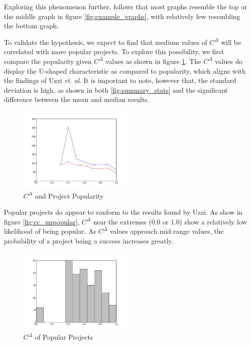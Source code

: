 \documentclass{proc}
\begin{document}
Exploring this phenomenon further, follows that most graphs resemble the top or the middle graph in figure \ref{fig:example_graphs}, with relatively few resembling the bottom graph.

To validate the hypothesis, we expect to find that medium values of $C^\Delta$ will be correlated with more popular projects. To explore this possibility, we first compare the popularity given $C^\Delta$ values as shown in figure \ref{fig:cc_graph}. The $C^\Delta$ values do display the U-shaped characteristic as compared to popularity, which aligns with the findings of Uzzi \textit{et. al}\cite{uzzi2005collaboration}. It is important to note, however that, the standard deviation is high, as shown in both \ref{fig:summary_stats} and the significant difference between the mean and median results.

\begin{figure}
\begin{center}
\includegraphics[width=0.5\textwidth]{images/freecode-graph.png}
\end{center}
\caption{$C^\Delta$ and Project Popularity}
\label{fig:cc_graph}
\end{figure}

Popular projects do appear to conform to the results found by Uzzi\cite{uzzi2005collaboration}. As show in figure \ref{fig:cc_unpopular}, $C^\Delta$ near the extremes (0.0 or 1.0) show a relatively low likelihood of being popular. As $C^\Delta$ values approach mid-range values, the probability of a project being a success increases greatly.


\begin{figure}
\begin{center}
\includegraphics[width=0.5\textwidth]{images/freecode-popular.png}
\end{center}
\caption{$C^\Delta$ of Popular Projects}
\label{fig:cc_popular}
\end{figure}
\end{document}
